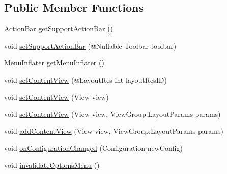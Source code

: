 \subsection*{Public Member Functions}
\begin{DoxyCompactItemize}
\item 
Action\+Bar \hyperlink{classcom_1_1example_1_1santh_1_1shoppinglist_1_1_app_compat_preference_activity_a91607b20523f10f8c0ad0fd98909dcd6}{get\+Support\+Action\+Bar} ()
\item 
void \hyperlink{classcom_1_1example_1_1santh_1_1shoppinglist_1_1_app_compat_preference_activity_a54367107d69645983c9fd1910aea94b7}{set\+Support\+Action\+Bar} (@Nullable Toolbar toolbar)
\item 
Menu\+Inflater \hyperlink{classcom_1_1example_1_1santh_1_1shoppinglist_1_1_app_compat_preference_activity_a02bbdc41671a52ca45ce63fd79344bd1}{get\+Menu\+Inflater} ()
\item 
void \hyperlink{classcom_1_1example_1_1santh_1_1shoppinglist_1_1_app_compat_preference_activity_a9d021010ecb1f31e868c641dd2a6e6b3}{set\+Content\+View} (@Layout\+Res int layout\+Res\+ID)
\item 
void \hyperlink{classcom_1_1example_1_1santh_1_1shoppinglist_1_1_app_compat_preference_activity_a64f5a742df7b01ab2e792f0a1cbb275f}{set\+Content\+View} (View view)
\item 
void \hyperlink{classcom_1_1example_1_1santh_1_1shoppinglist_1_1_app_compat_preference_activity_a3066cf4e43669fca5248a0b404ec98ae}{set\+Content\+View} (View view, View\+Group.\+Layout\+Params params)
\item 
void \hyperlink{classcom_1_1example_1_1santh_1_1shoppinglist_1_1_app_compat_preference_activity_ac28307936a76730b731bd8f97529f122}{add\+Content\+View} (View view, View\+Group.\+Layout\+Params params)
\item 
void \hyperlink{classcom_1_1example_1_1santh_1_1shoppinglist_1_1_app_compat_preference_activity_a37749d4fd93ceb1d7d00b7343f6985d6}{on\+Configuration\+Changed} (Configuration new\+Config)
\item 
void \hyperlink{classcom_1_1example_1_1santh_1_1shoppinglist_1_1_app_compat_preference_activity_a3dd424e0b20544d1ffb5192120829c20}{invalidate\+Options\+Menu} ()
\end{DoxyCompactItemize}
